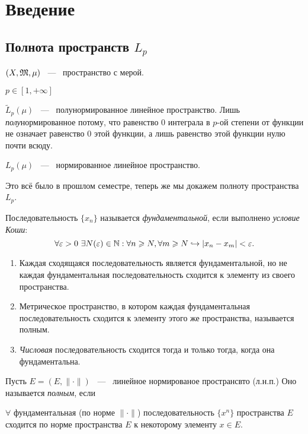 \section{Введение}
\subsection{Полнота пространств $L_p$}

\noindent

$(X, \mathfrak{M}, \mu)$ ~---~ пространство с мерой.

$p \in [1, +\infty]$

$\widetilde L_p (\mu)$  ~---~ полунормированное линейное пространство. Лишь \textit{полу}нормированное потому, что равенство 0 интеграла в $p$-ой степени от функции не означает равенство 0 этой функции, а лишь равенство этой функции нулю почти всюду.

$L_p (\mu)$ ~---~ нормированное линейное пространство.

Это всё было в прошлом семестре, теперь же мы докажем полноту пространства $L_p$.

\begin{reminder}
    Последовательность $\{ x_{n} \}$ называется \textit{фундаментальной}, если выполнено \textit{условие Коши}:
$$ \forall \varepsilon > 0 \  \exists N (\varepsilon) \in \mathbb{N}: \forall n \geqslant N, \forall m \geqslant N \hookrightarrow |x_{n} - x_{m}| < \varepsilon. $$
\begin{enumerate}
    \item Каждая сходящаяся последовательность является фундаментальной, но не каждая фундаментальная последовательность сходится к элементу из своего пространства.
    \item Метрическое пространство, в котором каждая фундаментальная последовательность сходится к элементу этого же пространства, называется полным.
    \item \textit{Числовая} последовательность сходится тогда и только тогда, когда она фундаментальна.
\end{enumerate}

\end{reminder}

\begin{definition}
	Пусть $E = (E, \|\cdot\|)$  ~---~ линейное нормированое пространсвто (л.н.п.) Оно называется \textit{полным}, если

	$\forall$ фундаментальная (по норме $\|\cdot\|$) последовательность $\{x^n\}$ пространства $E$ сходится по норме пространства $E$ к некоторому элементу $x \in E$.
\end{definition}

